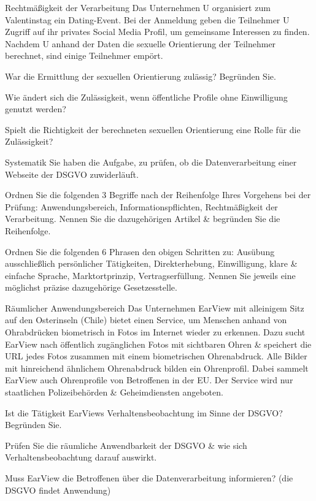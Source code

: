 \documentclass{exercisesheet}
\begin{document}
\begin{eexercises}{Rechtmäßigkeit der Verarbeitung}{
    Das Unternehmen U organisiert zum Valentinstag ein Dating-Event. Bei der Anmeldung geben die Teilnehmer U Zugriff auf ihr privates Social Media Profil, um gemeinsame Interessen zu finden. Nachdem U anhand der Daten die sexuelle Orientierung der Teilnehmer berechnet, sind einige Teilnehmer empört.
  }
  \item War die Ermittlung der sexuellen Orientierung zulässig? Begründen Sie.
  \item Wie ändert sich die Zulässigkeit, wenn öffentliche Profile ohne Einwilligung genutzt werden?
  \item Spielt die Richtigkeit der berechneten sexuellen Orientierung eine Rolle für die Zulässigkeit?
\end{eexercises}

\begin{eexercises}{Systematik}{
    Sie haben die Aufgabe, zu prüfen, ob die Datenverarbeitung einer Webseite der DSGVO zuwiderläuft.
  }
  \item Ordnen Sie die folgenden 3 Begriffe nach der Reihenfolge Ihres Vorgehens bei der Prüfung: Anwendungsbereich, Informationspflichten, Rechtmäßigkeit der Verarbeitung. Nennen Sie die dazugehörigen Artikel \& begründen Sie die Reihenfolge.
  \item Ordnen Sie die folgenden 6 Phrasen den obigen Schritten zu: Ausübung ausschließlich persönlicher Tätigkeiten, Direkterhebung, Einwilligung, klare \& einfache Sprache, Marktortprinzip, Vertragserfüllung. Nennen Sie jeweils eine möglichst präzise dazugehörige Gesetzesstelle.
\end{eexercises}

\begin{eexercises}{Räumlicher Anwendungsbereich}{
    Das Unternehmen EarView mit alleinigem Sitz auf den Osterinseln (Chile) bietet einen Service, um Menschen anhand von Ohrabdrücken biometrisch in Fotos im Internet wieder zu erkennen. Dazu sucht EarView nach öffentlich zugänglichen Fotos mit sichtbaren Ohren \& speichert die URL jedes Fotos zusammen mit einem biometrischen Ohrenabdruck. Alle Bilder mit hinreichend ähnlichem Ohrenabdruck bilden ein Ohrenprofil. Dabei sammelt EarView auch Ohrenprofile von Betroffenen in der EU. Der Service wird nur staatlichen Polizeibehörden \& Geheimdiensten angeboten.
  }
  \item Ist die Tätigkeit EarViews Verhaltensbeobachtung im Sinne der DSGVO? Begründen Sie.
  \item Prüfen Sie die räumliche Anwendbarkeit der DSGVO \& wie sich Verhaltensbeobachtung darauf auswirkt.
  \item Muss EarView die Betroffenen über die Datenverarbeitung informieren? (die DSGVO findet Anwendung)
\end{eexercises}
\end{document}
